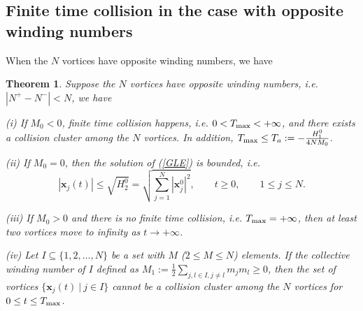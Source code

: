 \documentclass{aims}
\theoremstyle{plain}
\newtheorem{theorem}{Theorem}[section]
\theoremstyle{definition}
\newcommand{\bx}{{\mathbf x}}
\newcommand{\bX}{{\mathbf X}}
\newcommand{\be} {\begin{equation}}
\newcommand{\ee}{\end{equation}}
\begin{document}
\subsection{Finite time collision in the case with opposite winding numbers}
When the $N$ vortices have opposite winding numbers, we have

\begin{theorem}\label{fi}
Suppose the $N$ vortices have opposite winding numbers,
i.e. $|N^+-N^-|<N$, we have

(i)  If $M_0<0$, finite time collision happens, i.e.
$0<T_{\rm max}<+\infty$,
and there exists a collision cluster among the $N$ vortices. In addition,
$T_{\rm max}\leq T_a:=-\frac{H_1^0}{4NM_0}$.

(ii) If $M_0=0$, then the solution of {\rm(\ref{GLE})} is
bounded, i.e.
\be\label{bxjb1}
|\bx_j(t)|\le \sqrt{H_2^0}=\sqrt{\sum_{j=1}^N|\bx_j^0|^2}, \qquad t\ge0, \qquad 1\le j\le N.
\ee

(iii) If $M_0>0$ and there is no finite time collision, i.e.
$T_{\rm max}=+\infty$, then at least two
vortices move to infinity as $t\rightarrow +\infty$.

(iv) %
Let $I\subseteq \{1,2,\ldots, N\}$ be a set with $M$ ($2\le M\le N$) elements.
If the collective winding number of $I$ defined as $M_1:=\frac{1}{2}\sum_{j,l\in I,j\ne l} m_jm_l\ge0$, then the set
of vortices $\{\bx_j(t) \ |\ j\in I\}$ cannot be a collision cluster
among the $N$ vortices  for $0\le t\le T_{\rm max}$.
\end{theorem}
\end{document}
